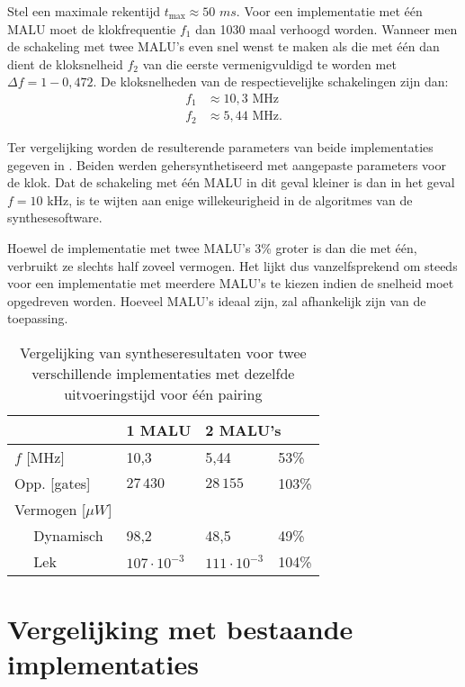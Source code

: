 Stel een maximale rekentijd $t_{\text{max}} \approx 50$ $ms$. Voor een implementatie met \'e\'en MALU moet de klokfrequentie $f_1$ dan 1030 maal verhoogd worden. Wanneer men de schakeling met twee MALU's even snel wenst te maken als die met \'e\'en dan dient de kloksnelheid $f_2$ van die eerste vermenigvuldigd te worden met $\Delta f = 1 - 0,472$. De kloksnelheden van de respectievelijke schakelingen zijn dan:
\[\begin{aligned}
f_1	&\approx 10,3\text{ MHz}\\
f_2	&\approx 5,44\text{ MHz}.
\end{aligned}\]

Ter vergelijking worden de resulterende parameters van beide implementaties gegeven in . Beiden werden gehersynthetiseerd met aangepaste parameters voor de klok. Dat de schakeling met \'e\'en MALU in dit geval kleiner is dan in het geval $f = 10$ kHz, is te wijten aan enige willekeurigheid in de algoritmes van de synthesesoftware.

Hoewel de implementatie met twee MALU's 3\% groter is dan die met \'e\'en, verbruikt ze slechts half zoveel vermogen. Het lijkt dus vanzelfsprekend om steeds voor een implementatie met meerdere MALU's te kiezen indien de snelheid moet opgedreven worden. Hoeveel MALU's ideaal zijn, zal afhankelijk zijn van de toepassing.

\begin{table}[h]
	\caption{Vergelijking van syntheseresultaten voor twee verschillende implementaties met dezelfde uitvoeringstijd voor \'e\'en pairing}
	\label{tabel-resultaten-m1-vs-m2}

	\centering
	\begin{tabular}{lll@{$\;\;$}l}
		\toprule
		& 1 MALU	& \multicolumn{2}{l}{2 MALU's}\\
		\midrule
		$f$ [MHz]					& 10,3						& 5,44						& 53\% \\ 
		Opp. [gates]				& $27\,430$					& $28\,155$					& 103\% \\
		Vermogen [$\mu W$]		& 								& 								& \\
		$\quad$ Dynamisch			& 98,2						& 48,5						& 49\% \\
		$\quad$ Lek					& $107 \cdot 10^{-3}$	& $111 \cdot 10^{-3}$	& 104\% \\
		\bottomrule	
	\end{tabular}
\end{table}

\section{Vergelijking met bestaande implementaties}


